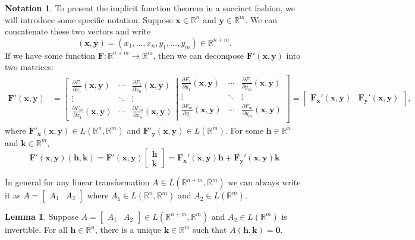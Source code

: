 \documentclass{article}
\newcommand{\R}{\mathbb{R}}
\newcommand{\x}{\mathbf{x}}
\newcommand{\F}{\mathbf{F}}
\newcommand{\y}{\mathbf{y}}
\newcommand{\h}{\mathbf{h}}
\newcommand{\ze}{\mathbf{0}}
\theoremstyle{definition}
\newtheorem{lemma}{Lemma}[section]
\newtheorem{note}{Notation}[section]
\begin{document}
	\begin{note}
		To present the implicit function theorem in a succinct fashion, we will introduce some specific notation. Suppose $ \x \in \R^n $ and $ \y\in \R^m $. We can concatenate  these two vectors and write
		$$ (\x,\y)=(x_1,\ldots,x_n,y_1,\ldots,y_m) \in \R^{n+m}.$$ If we have some function $ \mathbf F:\R^{n+m}\to \R^m $, then 
		we can decompose $ \mathbf F'(\x,\y) $ into two matrices:
		\begin{align*}
			\mathbf F'(\x,\y) &= \left[{\begin{matrix}{\frac {\partial F_{1}}{\partial x_{1}}}(\mathbf {x} ,\mathbf {y} )&\cdots &{\frac {\partial F_{1}}{\partial x_{n}}}(\mathbf {x} ,\mathbf {y} )\\\vdots &\ddots &\vdots \\{\frac {\partial F_{m}}{\partial x_{1}}}(\mathbf {x} ,\mathbf {y} )&\cdots &{\frac {\partial F_{m}}{\partial x_{n}}}(\mathbf {x} ,\mathbf {y} )\end{matrix}}\right|\left.{\begin{matrix}{\frac {\partial F_{1}}{\partial y_{1}}}(\mathbf {x} ,\mathbf {y} )&\cdots &{\frac {\partial F_{1}}{\partial y_{m}}}(\mathbf {x} ,\mathbf {y} )\\\vdots &\ddots &\vdots \\{\frac {\partial F_{m}}{\partial y_{1}}}(\mathbf {x} ,\mathbf {y} )&\cdots &{\frac {\partial F_{m}}{\partial y_{m}}}(\mathbf {x} ,\mathbf {y} )\\\end{matrix}}\right] = \begin{bmatrix}
				\mathbf F_\x'(\x,\y) & \mathbf F_\y'(\x,\y) 
			\end{bmatrix},
		\end{align*}
		where $ \F'_\x(\x,\y) \in L(\R^n,\R^m) $ and $ \F'_\y(\x,\y) \in L(\R^m) $. 
		For some $ \h\in\R^n $ and $ \mathbf k\in\R^m $, 
		$$  \mathbf F'(\x,\y)(\h,\mathbf k) = \mathbf F'(\x,\y) \begin{bmatrix}
			\h\\\mathbf k
		\end{bmatrix} = \mathbf F_\x'(\x,\y)\h + \mathbf F_\y'(\x,\y)\mathbf k  $$
	\end{note}
	In general for any linear transformation $ A\in L(\R^{n+m},\R^{m}) $ we can always write it as $ A=\begin{bmatrix}A_1&A_2\end{bmatrix}$ where $ A_1\in L(\R^n,\R^m) $ and $ A_2\in L(\R^m) $. 
	\begin{lemma}
		Suppose $ A=\begin{bmatrix}A_1&A_2\end{bmatrix}\in L(\R^{n+m},\R^m) $ and $ A_2\in L(\R^m) $ is invertible. For all $ \h\in\R^n $, there is a unique $ \mathbf k\in \R^m $ such that $ A(\h,\mathbf k)=\ze $.
	\end{lemma}
\end{document}
